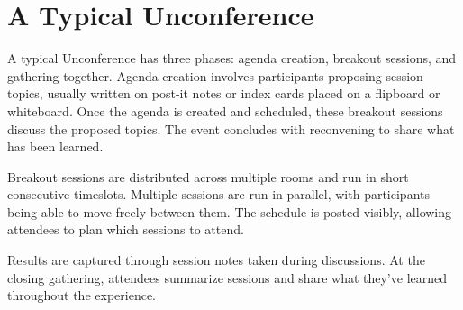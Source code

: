 \section{A Typical Unconference}
A typical Unconference has three phases: agenda creation, breakout sessions, and gathering together. Agenda creation involves participants proposing session topics, usually written on post-it notes or index cards placed on a flipboard or whiteboard. Once the agenda is created and scheduled, these breakout sessions discuss the proposed topics. The event concludes with reconvening to share what has been learned.

Breakout sessions are distributed across multiple rooms and run in short consecutive timeslots. Multiple sessions are run in parallel, with participants being able to move freely between them. The schedule is posted visibly, allowing attendees to plan which sessions to attend.

Results are captured through session notes taken during discussions. At the closing gathering, attendees summarize sessions and share what they've learned throughout the experience.